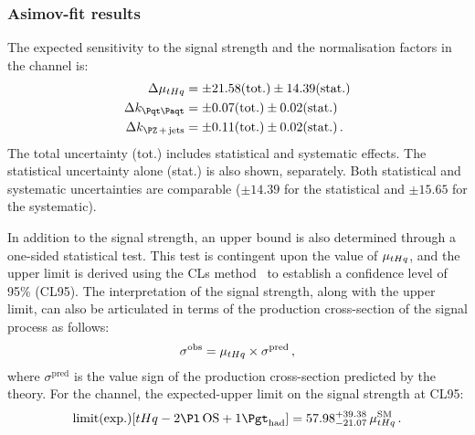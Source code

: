 \subsubsection{Asimov-fit results \dilepOStau}
\label{sec:ChaptH:Fit:ASIMOV:OS:results}
The expected sensitivity to the signal strength and the normalisation factors in the \dilepOStau channel is: 
\begin{align}
	\Delta \mu_{\tHq} 	&= \pm 21.58 (\text{tot.}) \pm 14.39 (\text{stat.}) \label{eq:ChaptH:ASIMOV:OS:POIs:mu} \\
	\Delta k_{\ttbar} 	&= \pm 0.07 (\text{tot.}) \pm 0.02 (\text{stat.}) \label{eq:ChaptH:ASIMOV:OS:POIs:ktt} \\
	\Delta k_{\Zjets} 	&= \pm 0.11 (\text{tot.}) \pm 0.02 (\text{stat.}) \label{eq:ChaptH:ASIMOV:OS:POIs:kzj} \, .
\end{align}
The total uncertainty (tot.) includes statistical and systematic effects.
The statistical uncertainty alone (stat.) is also shown, separately. 
Both statistical and systematic uncertainties are comparable
($\pm14.39$ for the statistical and $\pm15.65$ for the systematic).

In addition to the signal strength, an upper bound is also determined through  a one-sided statistical test. 
This test is contingent upon the value of $\mu_{tHq}$, and the upper limit is derived using the CLs 
method~\cite{Read:2002hq} to establish a confidence level of 95\% (CL95). The interpretation of the signal strength, 
along with the upper limit, can also be articulated in terms of the production cross-section of the signal process as follows:
\begin{equation*}
	\sigma^{\text{obs}} = \mu_{tHq} \times \sigma^{\text{pred}} \, ,
\end{equation*}
where $\sigma^{\text{pred}}$ is the value sign of the production cross-section predicted by the theory. 
For the \dilepOStau channel, the expected-upper limit on the signal strength at CL95:
\begin{equation*}
	\text{limit(exp.)} [\tHq - \dilepOStau] = 57.98^{+39.38}_{-21.07} \, \mu^{\text{SM}}_{\tHq}\, .
\end{equation*}



